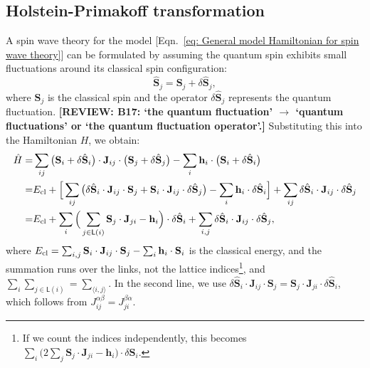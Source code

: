 \documentclass[aps, prx, nofootinbib, superscriptaddress]{revtex4-2}
\newcommand{\REVIEW}[1]{{\color{reviewcolor}\bfseries [REVIEW: #1]}}
\begin{document}
\subsection{Holstein-Primakoff transformation}\label{subsec: spin-to-boson transformation}
A spin wave theory for the model [Eqn.~\eqref{eq: General model Hamiltonian for spin wave theory}] can be formulated by assuming the quantum spin exhibits small fluctuations around its classical spin configuration:
\begin{equation}
    \hat{\mathbf{S}}_{j} = \mathbf{S}_{j} + \delta \hat{\mathbf{S}}_{j},
\end{equation}
where $\mathbf{S}_{j}$ is the classical spin and the operator $\delta \hat{\mathbf{S}}_{j}$ represents the quantum fluctuation.
\REVIEW{B17: `the quantum fluctuation' $\to$ `quantum fluctuations' or `the quantum fluctuation operator'.}
Substituting this into the Hamiltonian $H$, we obtain:
\begin{align*}
    \hat{H} 
    = & \sum_{ij} \big( \mathbf{S}_{i} + \delta \hat{\mathbf{S}}_{i} \big) \cdot \mathbf{J}_{ij} \cdot \big( \mathbf{S}_{j} + \delta \hat{\mathbf{S}}_{j} \big) - \sum_{i} \mathbf{h}_{i} \cdot \big( \mathbf{S}_{i} + \delta \hat{\mathbf{S}}_{i} \big) \\
    = & E_{\rm cl}
    + \Big[ \sum_{ij} \big( \delta \hat{\mathbf{S}}_{i} \cdot \mathbf{J}_{ij} \cdot \mathbf{S}_{j} + \mathbf{S}_{i} \cdot \mathbf{J}_{ij} \cdot \delta \hat{\mathbf{S}}_{j} \big) - \sum_{i} \mathbf{h}_{i} \cdot \delta \hat{\mathbf{S}}_{i} \Big] 
    + \sum_{ij} \delta \hat{\mathbf{S}}_{i} \cdot \mathbf{J}_{ij} \cdot \delta \hat{\mathbf{S}}_{j} \\
    = & E_{\rm cl}
    + \sum_{i} \Big( \sum_{j \in \mathsf{L}(i)} \mathbf{S}_{j} \cdot \mathbf{J}_{ji} - \mathbf{h}_{i} \Big) \cdot \delta \hat{\mathbf{S}}_{i}
    + \sum_{i,j} \delta \hat{\mathbf{S}}_{i} \cdot \mathbf{J}_{ij} \cdot \delta \hat{\mathbf{S}}_{j},
\end{align*}
where $E_{\rm cl} = \sum_{i,j} \mathbf{S}_{i} \cdot \mathbf{J}_{ij} \cdot \mathbf{S}_{j} - \sum_{i} \mathbf{h}_{i} \cdot \mathbf{S}_{i}$ is the classical energy, and the summation runs over the links, not the lattice indices\footnote{
    If we count the indices independently, this becomes $\sum_{i} \Big( 2 \sum_{j} \mathbf{S}_{j} \cdot \mathbf{J}_{ji} - \mathbf{h}_{i} \Big) \cdot \delta \hat{\mathbf{S}}_{i}$.
    },
and $\sum_{i} \sum_{j \in \mathsf{L}(i)} = \sum_{\langle i, j \rangle}$.
In the second line, we use $\delta \hat{\mathbf{S}}_{i} \cdot \mathbf{J}_{ij} \cdot \mathbf{S}_{j} = \mathbf{S}_{j} \cdot \mathbf{J}_{ji} \cdot \delta \hat{\mathbf{S}}_{i}$, which follows from $J_{ij}^{\alpha\beta} = J_{ji}^{\beta\alpha}$.
\end{document}
